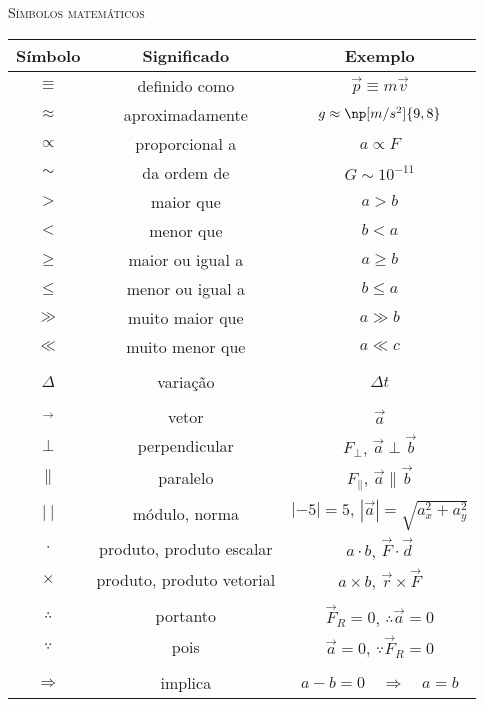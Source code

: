 \thispagestyle{plain}
\begin{fullwidth}
\begin{center}
{\noindent\LARGE\textsc{Símbolos matemáticos}} \\
\end{center}
\end{fullwidth}

\begin{table*}[!ht]
\centering
\begin{tabular}{ccc}
\toprule
Símbolo & Significado & Exemplo\\
\midrule
$\equiv$ & definido como & $\vec{p} \equiv m \vec{v}$ \\
$\approx$ & aproximadamente & $g \approx \np[m/s^2]{9,8}$\\
$\propto$ & proporcional a & $a \propto F$ \\
$\sim$ & da ordem de & $G \sim 10^{-11}$ \\
$>$ & maior que & $a>b$\\
$<$ & menor que & $b<a$\\
$\geqslant$ & maior ou igual a & $a \geqslant b$ \\
$\leqslant$ & menor ou igual a & $b \leqslant a$ \\
$\gg$ & muito maior que & $a \gg b$ \\
$\ll$ & muito menor que & $a \ll c$ \\
\\
$\Delta$ & variação & $\Delta t$ \\
\\
$\vec{~}$ & vetor & $\vec{a}$ \\
$\perp$ & perpendicular & $F_\perp$, $\vec{a}\perp\vec{b}$ \\
$\parallel$ & paralelo & $F_\parallel$, $\vec{a}\parallel\vec{b}$\\
$|~|$ & módulo, norma & $|-5| = 5$, $|\vec{a}| = \sqrt{a_x^2 + a_y^2}$
\\
$\cdot$ & produto, produto escalar & $a \cdot b$, $\vec{F}\cdot\vec{d}$ \\
$\times$ & produto, produto vetorial & $a \times b$, $\vec{r}\times\vec{F}$ \\
\\
$\therefore$ & portanto & $\vec{F}_R = 0$, $\therefore \vec{a} = 0$\\
$\because$ & pois & $\vec{a} = 0$, $\because \vec{F}_R = 0$\\
\\
$\Rightarrow$ & implica & $a - b = 0 \quad \Rightarrow \quad a = b$\\

\end{tabular}
\end{table*}
